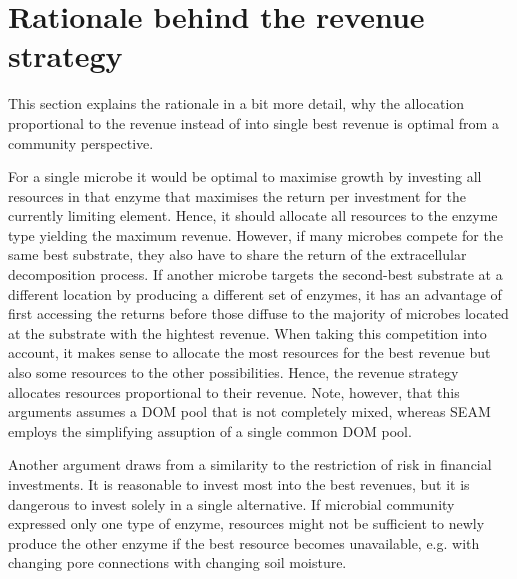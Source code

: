 \section{Rationale behind the revenue strategy \label{app:revenueRational}}    

This section explains the rationale in a bit more detail, why the allocation
proportional to the revenue instead of into single best revenue is optimal
from a community perspective.

For a single microbe it would be optimal to maximise growth by investing all
resources in that enzyme that maximises the return per investment for the
currently limiting element. Hence, it should allocate all resources to the
enzyme type yielding the maximum revenue.
However, if many microbes compete for the same best substrate, they also have to
share the return of the extracellular decomposition process. If another microbe
targets the second-best substrate at a different location by producing a
different set of enzymes, it has an advantage of first accessing the
returns before those diffuse to the majority of microbes located at the
substrate with the hightest revenue.
When taking this competition into account, it makes sense to allocate the most
resources for the best revenue but also some resources to the other
possibilities. Hence, the revenue strategy allocates resources proportional to
their revenue. Note, however, that this arguments assumes a DOM pool that is
not completely mixed, whereas SEAM employs the simplifying
assuption of a single common DOM pool.

Another argument draws from a similarity to the restriction of risk in financial
investments. It is reasonable to invest most into the best revenues, but it is
dangerous to invest solely in a single alternative. If microbial community
expressed only one type of enzyme, resources might not be sufficient to
newly produce the other enzyme if the best resource becomes
unavailable, e.g. with changing pore connections with changing soil moisture.





